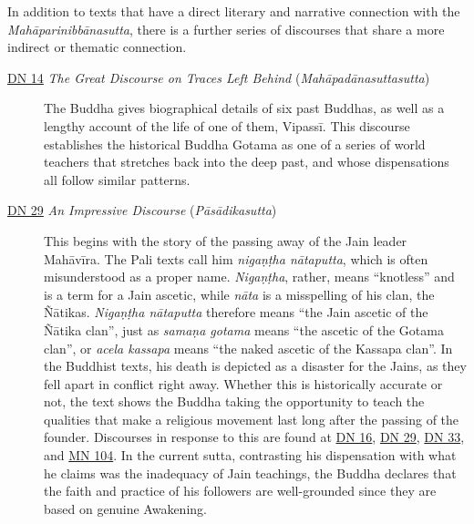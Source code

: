 \documentclass[12pt,openany]{book}%
\begin{document}
In addition to texts that have a direct literary and narrative connection with the \textit{\textsanskrit{Mahāparinibbānasutta}}, there is a further series of discourses that share a more indirect or thematic connection.

\begin{description}%
\item[\href{https://suttacentral.net/dn14}{DN 14} \textit{The Great Discourse on Traces Left Behind} (\textit{\textsanskrit{Mahāpadānasuttasutta}})] The Buddha gives biographical details of six past Buddhas, as well as a lengthy account of the life of one of them, \textsanskrit{Vipassī}. This discourse establishes the historical Buddha Gotama as one of a series of world teachers that stretches back into the deep past, and whose dispensations all follow similar patterns.%
\item[\href{https://suttacentral.net/dn29}{DN 29} \textit{An Impressive Discourse} (\textit{\textsanskrit{Pāsādikasutta}})] This begins with the story of the passing away of the Jain leader \textsanskrit{Mahāvīra}. The Pali texts call him \textit{\textsanskrit{nigaṇṭha} \textsanskrit{nātaputta}}, which is often misunderstood as a proper name. \textit{\textsanskrit{Nigaṇṭha}}, rather, means “knotless” and is a term for a Jain ascetic, while \textit{\textsanskrit{nāta}} is a misspelling of his clan, the \textsanskrit{Ñātikas}. \textit{\textsanskrit{Nigaṇṭha} \textsanskrit{nātaputta}} therefore means “the Jain ascetic of the \textsanskrit{Ñātika} clan”, just as \textit{\textsanskrit{samaṇa} gotama} means “the ascetic of the Gotama clan”, or \textit{acela kassapa} means “the naked ascetic of the Kassapa clan”. In the Buddhist texts, his death is depicted as a disaster for the Jains, as they fell apart in conflict right away. Whether this is historically accurate or not, the text shows the Buddha taking the opportunity to teach the qualities that make a religious movement last long after the passing of the founder. Discourses in response to this are found at \href{https://suttacentral.net/dn16}{DN 16}, \href{https://suttacentral.net/dn29}{DN 29}, \href{https://suttacentral.net/dn33}{DN 33}, and \href{https://suttacentral.net/mn104}{MN 104}. In the current sutta, contrasting his dispensation with what he claims was the inadequacy of Jain teachings, the Buddha declares that the faith and practice of his followers are well-grounded since they are based on genuine Awakening.%

\end{description}
\end{document}
